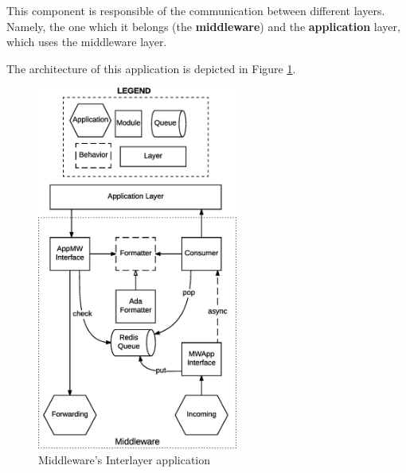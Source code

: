 
This component is responsible of the communication between
different layers. Namely, the one which it belongs (the \textbf{middleware}) and
the \textbf{application}
layer, which uses the middleware layer.

The architecture of this application is depicted
in Figure \ref{fig:mw-interlayer}.

\begin{figure}[H]
  \centering
  \includegraphics[height=12cm]{images/solution/mw/int/architect.eps}
  \caption{Middleware's Interlayer application}
  \label{fig:mw-interlayer}
\end{figure}

